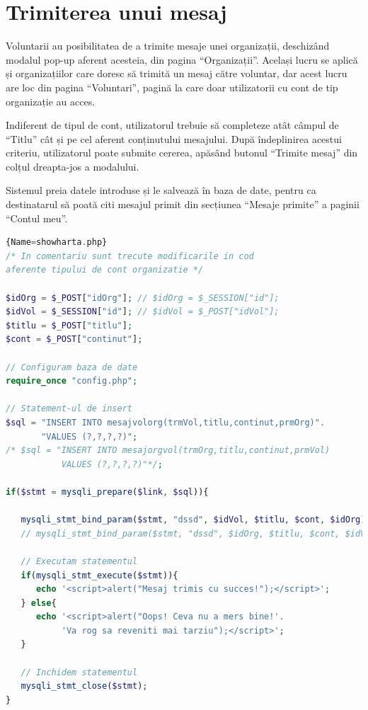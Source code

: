 \documentclass[12pt,a4paper]{report}
\begin{document}
\section{Trimiterea unui mesaj}
\par
Voluntarii au posibilitatea de a trimite mesaje unei organizații, deschizând modalul pop-up aferent acesteia, din pagina “Organizații”. Același lucru se aplică și organizațiilor care doresc să trimită un mesaj către voluntar, dar acest lucru are loc din pagina “Voluntari”, pagină la care doar utilizatorii cu cont de tip organizație au acces.
\\
\par
Indiferent de tipul de cont, utilizatorul trebuie să completeze atât câmpul de “Titlu” cât și pe cel aferent conținutului mesajului. După îndeplinirea acestui criteriu, utilizatorul poate submite cererea, apăsând butonul “Trimite mesaj” din colțul dreapta-jos a modalului.
\\
\par
Sistemul preia datele introduse și le salvează în baza de date, pentru ca destinatarul să poată citi mesajul primit din secțiunea  “Mesaje primite” a paginii  “Contul meu”.
\\

\begin{lstlisting}[basicstyle=\small, language=PHP]{Name=showharta.php}
/* In comentariu sunt trecute modificarile in cod 
aferente tipului de cont organizatie */

$idOrg = $_POST["idOrg"]; // $idOrg = $_SESSION["id"];
$idVol = $_SESSION["id"]; // $idVol = $_POST["idVol"];
$titlu = $_POST["titlu"];
$cont = $_POST["continut"];

// Configuram baza de date
require_once "config.php";

// Statement-ul de insert
$sql = "INSERT INTO mesajvolorg(trmVol,titlu,continut,prmOrg)".
       "VALUES (?,?,?,?)";
/* $sql = "INSERT INTO mesajorgvol(trmOrg,titlu,continut,prmVol) 
           VALUES (?,?,?,?)"*/;

if($stmt = mysqli_prepare($link, $sql)){

   mysqli_stmt_bind_param($stmt, "dssd", $idVol, $titlu, $cont, $idOrg);
   // mysqli_stmt_bind_param($stmt, "dssd", $idOrg, $titlu, $cont, $idVol);

   // Executam statementul
   if(mysqli_stmt_execute($stmt)){
      echo '<script>alert("Mesaj trimis cu succes!");</script>';
   } else{
      echo '<script>alert("Oops! Ceva nu a mers bine!'.
           'Va rog sa reveniti mai tarziu");</script>';
   }

   // Inchidem statementul
   mysqli_stmt_close($stmt);
}
\end{lstlisting}
\end{document}

